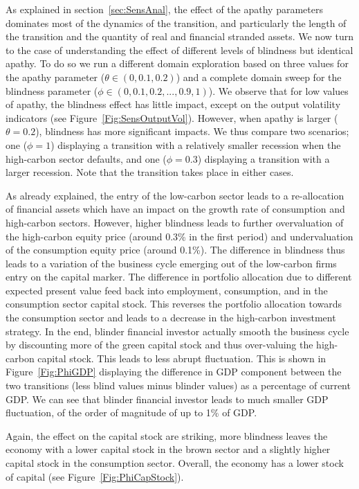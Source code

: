 \documentclass[authoryear]{article}
\begin{document}
As explained in section~\ref{sec:SensAnal}, the effect of the apathy parameters dominates most of the dynamics of the transition, and particularly the length of the transition and the quantity of real and financial stranded assets. We now turn to the case of understanding the effect of different levels of blindness  but identical apathy. To do so we run a different domain exploration based on three values for the apathy parameter ($\theta \in \left(0,0.1,0.2\right)$) and a complete domain sweep for the blindness parameter ($\phi \in \left(0,0.1,0.2,...,0.9,1\right)$). We observe that for low values of apathy, the blindness effect has little impact, except on the output volatility indicators (see Figure~\ref{Fig:SensOutputVol}). However, when apathy is larger ($\theta=0.2$), blindness has more significant impacts. We thus compare two scenarios; one ($\phi=1$) displaying a transition with a relatively smaller recession when the high-carbon sector defaults, and one ($\phi=0.3$) displaying a transition with a larger recession. Note that the transition takes place in either cases.

As already explained, the entry of the low-carbon sector leads to a re-allocation of financial assets which have an impact on the growth rate of consumption and high-carbon sectors. However, higher blindness leads to further overvaluation of the high-carbon equity price (around 0.3\% in the first period) and undervaluation of the consumption equity price (around 0.1\%). The difference in blindness thus leads to a variation of the business cycle emerging out of the low-carbon firms entry on the capital marker. The difference in portfolio allocation due to different expected present value feed back into employment, consumption, and in the consumption sector capital stock. This reverses the portfolio allocation towards the consumption sector and leads to a decrease in the high-carbon investment strategy. In the end, blinder financial investor actually smooth the business cycle by discounting more of the green capital stock and thus over-valuing the high-carbon capital stock. This
leads to less abrupt fluctuation. This is shown in Figure~\ref{Fig:PhiGDP} displaying the difference in GDP component between the two transitions (less blind values minus blinder values) as a percentage of current GDP. We can see that blinder financial investor leads to much smaller GDP fluctuation, of the order of magnitude of up to 1\% of GDP.

Again, the effect on the capital stock are striking, more blindness leaves the economy with a lower capital stock in the brown sector and a slightly higher capital stock in the consumption sector. Overall, the economy has a lower stock of capital (see Figure~\ref{Fig:PhiCapStock}).
\end{document}
